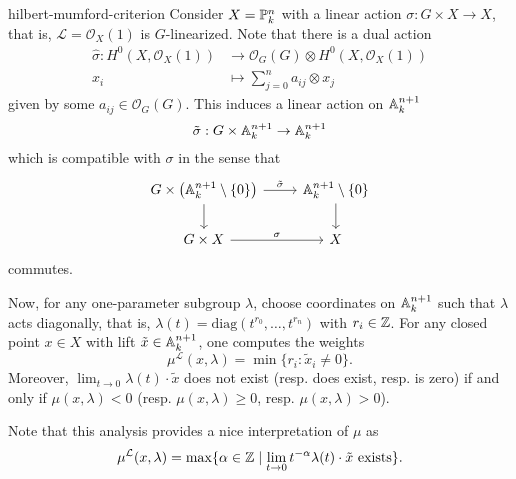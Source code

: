 \begin{example}{hilbert-mumford-criterion}
    Consider $X = \PP^n_k$ with a linear action $\sigma : G \times X \to X$, that is, $\mathcal{L} = \mathcal{O}_X(1)$ is $G$-linearized. Note that there is a dual action
    \[ \begin{aligned}
        \hat{\sigma} : H^0(X, \mathcal{O}_X(1)) &\to \mathcal{O}_G(G) \otimes H^0(X, \mathcal{O}_X(1)) \\
        x_i &\mapsto \sum_{j = 0}^{n} a_{ij} \otimes x_j
    \end{aligned} \]
    given by some $a_{ij} \in \mathcal{O}_G(G)$. This induces a linear action on $\AA^{n + 1}_k$
    \[ \tilde{\sigma} : G \times \AA^{n + 1}_k \to \AA^{n + 1}_k \]
    which is compatible with $\sigma$ in the sense that
    \[ \begin{tikzcd}
        G \times \left(\AA^{n + 1}_k \setminus \{ 0 \} \right) \arrow{d} \arrow{r}{\tilde{\sigma}} & \AA^{n + 1}_k \setminus \{ 0 \} \arrow{d} \\
        G \times X \arrow{r}{\sigma} & X
    \end{tikzcd} \]
    commutes.
    
    Now, for any one-parameter subgroup $\lambda$, choose coordinates on $\AA^{n + 1}_k$ such that $\lambda$ acts diagonally, that is, $\lambda(t) = \text{diag}(t^{r_0}, \ldots, t^{r_n})$ with $r_i \in \ZZ$. For any closed point $x \in X$ with lift $\tilde{x} \in \AA^{n + 1}_k$, one computes the weights
    \[ \mu^{\mathcal{L}}(x, \lambda) = \min \{ r_i : \tilde{x}_i \ne 0 \} . \]
    Moreover, $\lim_{t \to 0} \lambda(t) \cdot \tilde{x}$ does not exist (resp. does exist, resp. is zero) if and only if $\mu(x, \lambda) < 0$ (resp. $\mu(x, \lambda) \ge 0$, resp. $\mu(x, \lambda) > 0$). 
    
    Note that this analysis provides a nice interpretation of $\mu$ as
    \[ \mu^{\mathcal{L}}(x, \lambda) = \max \{ \alpha \in \ZZ \mid \lim_{t \to 0} t^{-\alpha} \lambda(t) \cdot \tilde{x} \text{ exists} \} . \]
\end{example}

